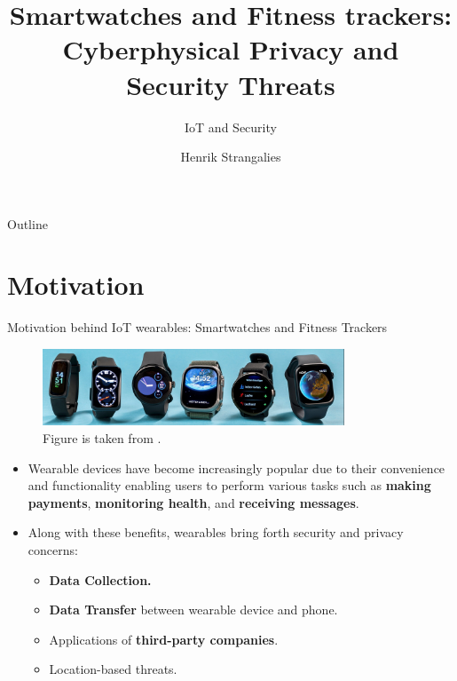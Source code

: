 \documentclass[ucs,9pt]{beamer}
\title[Privacy and Security Threats of IoT Wearables] %
{Smartwatches and Fitness trackers: Cyberphysical Privacy and Security Threats}
\subtitle
{IoT and Security}
\author[Author, Another] %
{Henrik Strangalies} %
\institute[Computer Science] %
{Freie Universität Berlin}
\begin{document}
\begin{frame}[plain]
  \titlepage
\end{frame}

\begin{frame}{Outline}
  \tableofcontents
\end{frame}

\section{Motivation}



\begin{frame}{Motivation behind IoT wearables: Smartwatches and Fitness Trackers}
  
  \vspace{0.3cm}
  \begin{figure}
  	\centering
  	\includegraphics[width=9cm]{imgs/smartwatches}
  	\caption{Figure is taken from \cite{smartwatches}.}
  \end{figure}
  
  \begin{itemize}
  \item Wearable devices have become increasingly popular due to their convenience and functionality enabling users to perform various tasks such as \textbf{making payments}, \textbf{monitoring health}, and \textbf{receiving messages}.
 
  
  \pause 
  
  \item  Along with these benefits, wearables bring forth security and privacy concerns:
  \begin{itemize}
	\item \textbf{Data Collection.}
	\item \textbf{Data Transfer} between wearable device and phone.
	\item Applications of \textbf{third-party companies}.
	\item Location-based threats.
  \end{itemize}
  \end{itemize}
\end{frame}
\end{document}
